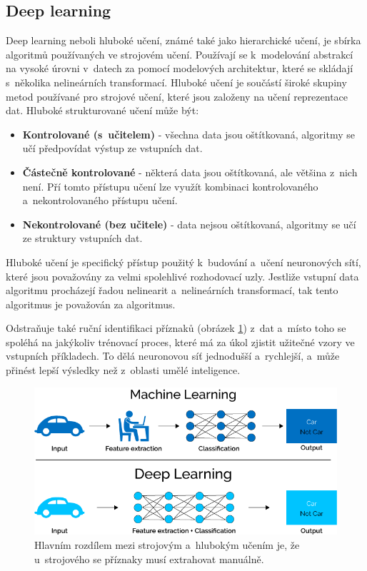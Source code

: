 \subsection{Deep learning}
Deep learning neboli hluboké učení, známé také jako hierarchické učení, je sbírka algoritmů používaných ve strojovém učení. Používají se k~modelování abstrakcí na vysoké úrovni v~datech za pomocí modelových architektur, které se skládají s~několika nelineárních transformací. Hluboké učení je součástí široké skupiny metod používané pro strojové učení, které jsou založeny na učení reprezentace dat. Hluboké strukturované učení může být:
\begin{itemize}
  \item{\textbf{Kontrolované (s~učitelem)} - všechna data jsou oštítkovaná, algoritmy se učí předpovídat výstup ze vstupních dat.}
  \item{\textbf{Částečně kontrolované} - některá data jsou oštítkovaná, ale většina z~nich není. Pří tomto přístupu učení lze využít kombinaci kontrolovaného a~nekontrolovaného přístupu učení.}
  \item{\textbf{Nekontrolované (bez učitele)} - data nejsou oštítkovaná, algoritmy se učí ze struktury vstupních dat.}
\end{itemize}
Hluboké učení je specifický přístup použitý k~budování a~učení neuronových sítí, které jsou považovány za velmi spolehlivé rozhodovací uzly. Jestliže vstupní data algoritmu procházejí řadou nelinearit a~nelineárních transformací, tak tento algoritmus je považován za  algoritmus. 

Odstraňuje také ruční identifikaci příznaků (obrázek \ref{fig:ml_vs_ann}) z~dat a~místo toho se spoléhá na jakýkoliv trénovací proces, které má za úkol zjistit užitečné vzory ve vstupních příkladech. To dělá neuronovou síť jednodušší a~rychlejší, a~může přinést lepší výsledky než z~oblasti umělé inteligence.

\begin{figure}[H]
\centering
\includegraphics[width=.85\linewidth]{figures/ml_vs_ann}
\caption{Hlavním rozdílem mezi strojovým a~hlubokým učením je, že u~strojového se příznaky musí extrahovat manuálně. \cite{fig:mlvsann}}
\label{fig:ml_vs_ann}
\end{figure}

